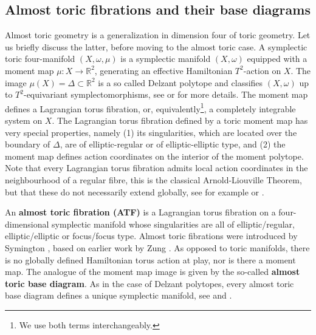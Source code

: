 \documentclass[12pt,a4paper,abstract=true,final]{scrartcl}
\begin{document}
\subsection{Almost toric fibrations and their base diagrams}
\label{sec:atgeometry}

Almost toric geometry is a generalization in dimension four of toric geometry.
Let us briefly discuss the latter, before moving to the almost toric case.
A symplectic toric four-manifold $(X,\omega,\mu)$ is a symplectic manifold $(X,\omega)$ equipped with a moment map $\mu \colon X \rightarrow \mathbb{R}^2$, generating an effective Hamiltonian $T^2$-action on $X$.
The image $\mu(X) = \Delta \subset \mathbb{R}^2$ is a so called Delzant polytope and classifies $(X,\omega)$ up to $T^2$-equivariant symplectomorphisms, see \cite{Del88} or \cite{Can03} for more details.
The moment map defines a Lagrangian torus fibration, or, equivalently\footnote{We use both terms interchangeably.}, a completely integrable system on $X$.
The Lagrangian torus fibration defined by a toric moment map has very special properties, namely (1) its singularities, which are located over the boundary of $\Delta$, are of elliptic-regular or of elliptic-elliptic type, and (2) the moment map defines action coordinates on the interior of the moment polytope.
Note that every Lagrangian torus fibration admits local action coordinates in the neighbourhood of a regular fibre, this is the classical Arnold-Liouville Theorem, but that these do not necessarily extend globally, see for example \cite{Dui80} or \cite{Zun96,Zun03}.

An \textbf{almost toric fibration (ATF)} is a Lagrangian torus fibration on a four-dimensional symplectic manifold whose singularities are all of elliptic\-/regular, elliptic\-/elliptic or focus\-/focus type.
Almost toric fibrations were introduced by Sy\-ming\-ton \cite{symington2002FourDF}, based on earlier work by Zung \cite{Zun96,Zun97,Zun03}.
As opposed to toric manifolds, there is no globally defined Hamiltonian torus action at play, nor is there a moment map.
The analogue of the moment map image is given by the so-called \textbf{almost toric base diagram}.
As in the case of Delzant polytopes, every almost toric base diagram defines a unique symplectic manifold, see \cite[Corollary 5.4]{symington2002FourDF} and  \cite[Theorem 8.5]{evans2021atfs}. 
\end{document}
